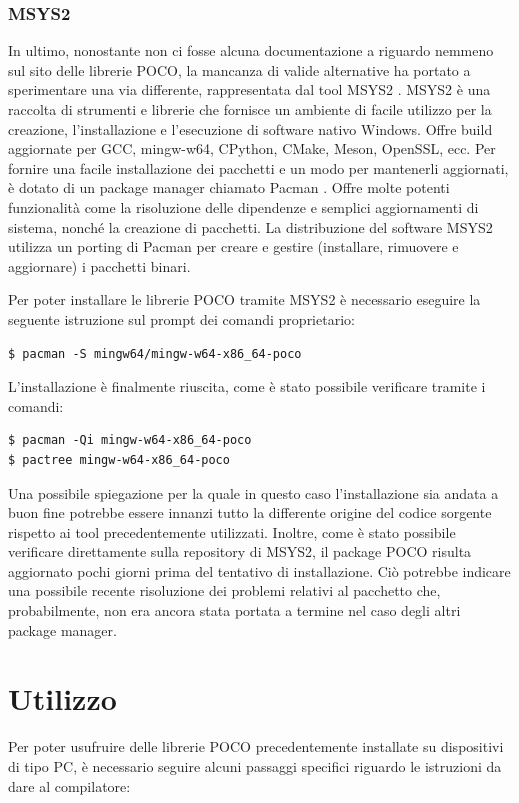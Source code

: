 \subsubsection{MSYS2}
In ultimo, nonostante non ci fosse alcuna documentazione a riguardo nemmeno sul sito delle librerie POCO, la mancanza di valide alternative ha portato a sperimentare una via differente, rappresentata dal tool MSYS2 \cite{MSYS2}. MSYS2 è una raccolta di strumenti e librerie che fornisce un ambiente di facile utilizzo per la creazione, l'installazione e l'esecuzione di software nativo Windows. Offre build aggiornate per GCC, mingw-w64, CPython, CMake, Meson, OpenSSL, ecc. Per fornire una facile installazione dei pacchetti e un modo per mantenerli aggiornati, è dotato di un package manager chiamato Pacman \cite{Pacman}. Offre molte potenti funzionalità come la risoluzione delle dipendenze e semplici aggiornamenti di sistema, nonché la creazione di pacchetti. La distribuzione del software MSYS2 utilizza un porting di Pacman per creare e gestire (installare, rimuovere e aggiornare) i pacchetti binari.

Per poter installare le librerie POCO tramite MSYS2 è necessario eseguire la seguente istruzione sul prompt dei comandi proprietario:

\begin{verbatim}
$ pacman -S mingw64/mingw-w64-x86_64-poco
\end{verbatim}

L’installazione è finalmente riuscita, come è stato possibile verificare tramite i comandi:

\begin{verbatim}
$ pacman -Qi mingw-w64-x86_64-poco
$ pactree mingw-w64-x86_64-poco
\end{verbatim}

Una possibile spiegazione per la quale in questo caso l’installazione sia andata a buon fine potrebbe essere innanzi tutto la differente origine del codice sorgente rispetto ai tool precedentemente utilizzati. Inoltre, come è stato possibile verificare direttamente sulla repository di MSYS2, il package POCO risulta aggiornato pochi giorni prima del tentativo di installazione. Ciò potrebbe indicare una possibile recente risoluzione dei problemi relativi al pacchetto che, probabilmente, non era ancora stata portata a termine nel caso degli altri package manager.

\section{Utilizzo}\label{utilizzo}
Per poter usufruire delle librerie POCO precedentemente installate su dispositivi di tipo PC, è necessario seguire alcuni passaggi specifici riguardo le istruzioni da dare al compilatore:

